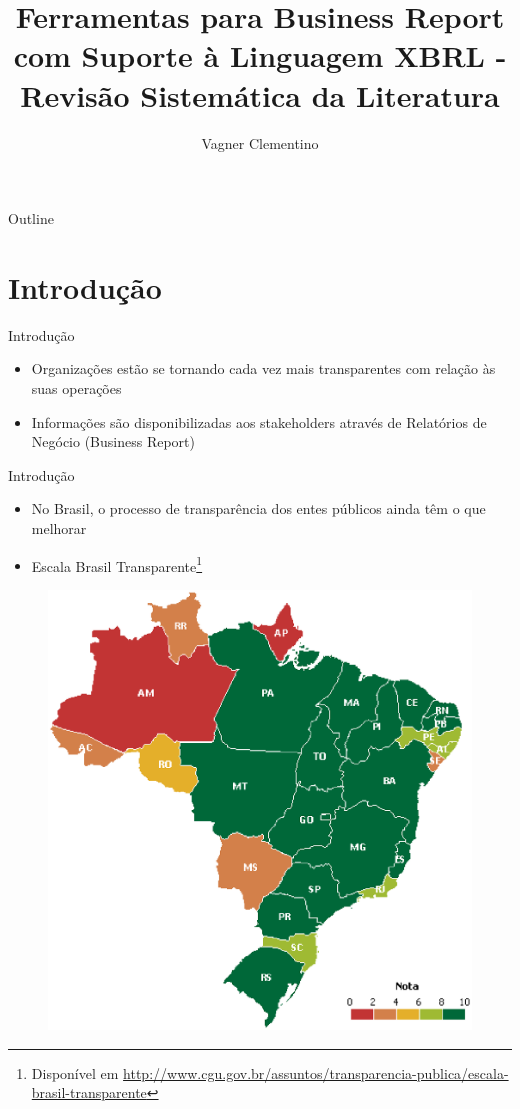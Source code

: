 \documentclass[t,14pt,mathserif]{beamer}
\title[] %
{Ferramentas para Business Report \\
com Suporte à Linguagem XBRL - \\
Revisão Sistemática da Literatura}
\subtitle
{Vagner Clementino}
\institute[] %
{
  Departamento de Ciência da Computação\\
  Universidade Federal de Minas Gerais (UFMG)\\
  Empirical Software Engineering - 2015\\
  }
\date[2015/12/16] %
\begin{document}
\begin{frame}
  \titlepage
\end{frame}

\begin{frame}{Outline}
  \tableofcontents
\end{frame}




\section{Introdução}
\begin{frame}{Introdução}
    \begin{itemize}
      \item Organizações estão se tornando cada vez mais transparentes com
        relação às suas operações
      \item Informações são disponibilizadas aos stakeholders através de
        Relatórios de Negócio (Business Report)

    \end{itemize}
\end{frame}

\begin{frame}{Introdução}
    \begin{itemize}
      \item No Brasil, o processo de transparência dos entes públicos ainda têm
        o que melhorar
       \item Escala Brasil Transparente\footnote{Disponível em \url{http://www.cgu.gov.br/assuntos/transparencia-publica/escala-brasil-transparente}}
    \end{itemize}

\begin{figure}[htb]
\centering
\includegraphics[width=.357\textwidth]{../img/ebt.eps}
\end{figure}
\end{frame}
\end{document}
